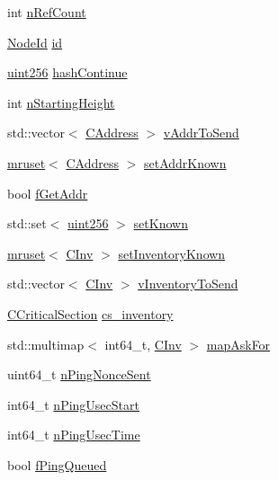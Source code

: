 \begin{DoxyCompactItemize}
\item 
int \hyperlink{class_c_node_a01f8cac776bef676651f9b8f3f80ae98}{n\+Ref\+Count}
\item 
\hyperlink{net_8h_a954d746a58632565552615fd0a4ee660}{Node\+Id} \hyperlink{class_c_node_af99591c635f495fc1e6c14745a2a4203}{id}
\item 
\hyperlink{classuint256}{uint256} \hyperlink{class_c_node_a1a1c0d94de0197c5c4abf5a8d13364f3}{hash\+Continue}
\item 
int \hyperlink{class_c_node_a597b41bd64e2ac9391b7211e65aeb52a}{n\+Starting\+Height}
\item 
std\+::vector$<$ \hyperlink{class_c_address}{C\+Address} $>$ \hyperlink{class_c_node_a9b2d9b9182ff111c79f704594c4aa2e1}{v\+Addr\+To\+Send}
\item 
\hyperlink{classmruset}{mruset}$<$ \hyperlink{class_c_address}{C\+Address} $>$ \hyperlink{class_c_node_ac21266ce880bd36b98ba7cfcc447a30f}{set\+Addr\+Known}
\item 
bool \hyperlink{class_c_node_a3da9c559959e182aff8439cd004ff624}{f\+Get\+Addr}
\item 
std\+::set$<$ \hyperlink{classuint256}{uint256} $>$ \hyperlink{class_c_node_ab1b30fa8e48005752f6b0bcf43eca478}{set\+Known}
\item 
\hyperlink{classmruset}{mruset}$<$ \hyperlink{class_c_inv}{C\+Inv} $>$ \hyperlink{class_c_node_ae15aa9a971040800c26bc87b1250220f}{set\+Inventory\+Known}
\item 
std\+::vector$<$ \hyperlink{class_c_inv}{C\+Inv} $>$ \hyperlink{class_c_node_abcd24c9478bc1ab5ba6de6b369080cec}{v\+Inventory\+To\+Send}
\item 
\hyperlink{sync_8h_a37a4692b2d517f2843655ca11af7668a}{C\+Critical\+Section} \hyperlink{class_c_node_a1e8b0784cc82f33edc2dc4e2834d1ff0}{cs\+\_\+inventory}
\item 
std\+::multimap$<$ int64\+\_\+t, \hyperlink{class_c_inv}{C\+Inv} $>$ \hyperlink{class_c_node_a7593dfbd76c34a81169e3fb2aa0e0cf7}{map\+Ask\+For}
\item 
uint64\+\_\+t \hyperlink{class_c_node_a9a077fbd09ddee1d81f027bc01a4ec68}{n\+Ping\+Nonce\+Sent}
\item 
int64\+\_\+t \hyperlink{class_c_node_a8352aa332af726ff117fb890c4dd3869}{n\+Ping\+Usec\+Start}
\item 
int64\+\_\+t \hyperlink{class_c_node_ada34ffe1700a5dafb57de7c4d2491844}{n\+Ping\+Usec\+Time}
\item 
bool \hyperlink{class_c_node_aa1e9c1dc1d5cf806b9be0af155c0bf90}{f\+Ping\+Queued}
\end{DoxyCompactItemize}
